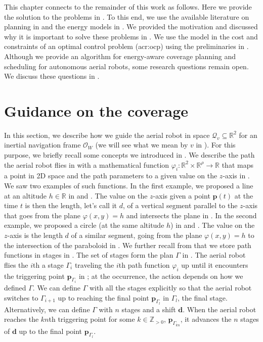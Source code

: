 This chapter connects to the remainder of this work as follows. Here we provide the solution to the problems in . To this end, we use the available literature on planning in  and the energy models in . We provided the motivation and discussed why it is important to solve these problems in . We use the model in the cost and constraints of an optimal control problem (\Gls{acr:ocp}) using the preliminaries in . Although we provide an algorithm for energy-aware coverage planning and scheduling for autonomous aerial robots, some research questions remain open. We discuss these questions in .


\section{Guidance on the coverage}\label{sec:gvf}

In this section, we describe how we guide the aerial robot in space $\mathcal{Q}_v\subseteq\mathbb{R}^2$ for an inertial navigation frame $\mathcal{O}_W$ (we will see what we mean by $v$ in ). For this purpose, we briefly recall some concepts we introduced in . We describe the path the aerial robot flies in  with a mathematical function $\varphi_i:\mathbb{R}^2\times\mathbb{R}^\rho\rightarrow\mathbb{R}$ that maps a point in 2D space and the path parameters to a given value on the $z$-axis in . We saw two examples of such functions. In the first example, we proposed a line at an altitude $h\in\mathbb{R}$ in  and . The value on the $z$-axis given a point $\mathbf{p}(t)$ at the time $t$ is then the length, let's call it $d$, of a vertical segment parallel to the $z$-axis that goes from the plane $\varphi(x,y)=h$ and intersects the plane in . In the second example, we proposed a circle (at the same altitude $h$) in  and . The value on the $z$-axis is the length $d$ of a similar segment, going from the plane $\varphi(x,y)=h$ to the intersection of the paraboloid in . We further recall from  that we store path functions in stages in . The set of stages form the plan $\Gamma$ in . The aerial robot flies the $i$th a stage $\Gamma_i$ traveling the $i$th path function $\varphi_i$ up until it encounters the triggering point $\mathbf{p}_{\Gamma_i}$ in ; at the occurrence, the action depends on how we defined $\Gamma$. We can define $\Gamma$ with all the stages explicitly so that the aerial robot switches to $\Gamma_{i+1}$ up to reaching the final point $\mathbf{p}_{\Gamma_l}$ in $\Gamma_l$, the final stage. Alternatively, we can define $\Gamma$ with $n$ stages and a shift $\mathbf{d}$. When the aerial robot reaches the $kn$th triggering point for some $k\in\mathbb{Z}_{>0}$, $\mathbf{p}_{\Gamma_{kn}}$, it advances the $n$ stages of $\mathbf{d}$ up to the final point $\mathbf{p}_{\Gamma_l}$.

